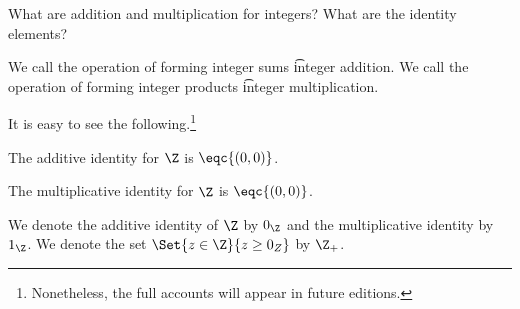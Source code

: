 

What are addition and multiplication for integers?
What are the identity elements?



We call the operation of forming integer sums \t{integer addition}.
We call the operation of forming integer products \t{integer multiplication}.


It is easy to see the following.\footnote{Nonetheless, the full accounts will appear in future editions.}

\begin{proposition}
  The additive identity for $\Z$ is $\eqc{(0, 0)}$.
\end{proposition}

\begin{proposition}
  The multiplicative identity for $\Z$ is $\eqc{(0, 0)}$.
\end{proposition}


We denote the additive identity of $\Z$ by $0_{\Z}$ and the multiplicative identity by $1_{\Z}$.
We denote the set $\Set{z \in \Z}{z \geq 0_{Z}}$ by $\Z_{+}$.

\blankpage
